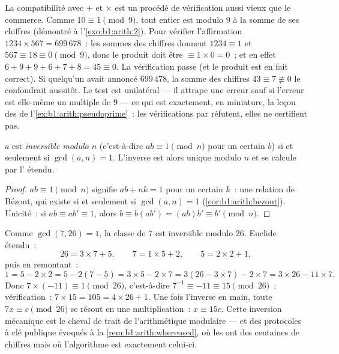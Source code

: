 \begin{example}\label{ex:b1:arith:castingnines}
La compatibilité avec $+$ et $\times$ est un procédé de vérification
aussi vieux que le commerce. Comme $10 \equiv 1 \pmod 9$, tout entier est
 modulo $9$ à la somme de ses chiffres (démontré à
l'\cref{exo:b1:arith:2}). Pour vérifier l'affirmation $1234 \times 567 =
699\,678$~: les sommes des chiffres donnent $1234 \equiv 1$ et $567 \equiv 18
\equiv 0 \pmod 9$, donc le produit doit être $\equiv 1 \times 0 =
0$~; et en effet $6 + 9 + 9 + 6 + 7 + 8 = 45 \equiv 0$. La vérification
passe (et le produit est en fait correct). Si quelqu'un avait annoncé
$699\,478$, la somme des chiffres $43 \equiv 7 \not\equiv 0$ le
confondrait aussitôt. Le test est unilatéral --- il attrape une
erreur sauf si l'erreur est elle-même un multiple de $9$ --- ce qui est
exactement, en miniature, la leçon des  de
l'\cref{ex:b1:arith:pseudoprime}~: les vérifications par 
réfutent, elles ne certifient pas.
\end{example}

\begin{proposition}\label{prop:b1:arith:invmod}
$a$ est \emph{inversible modulo $n$} (c'est-à-dire $ab \equiv 1 \pmod n$ pour un
certain $b$) si et seulement si $\gcd(a, n) = 1$. L'inverse est alors unique modulo
$n$ et se calcule par l' étendu.
\end{proposition}

\begin{proof}
$ab \equiv 1 \pmod n$ signifie $ab + nk = 1$ pour un certain $k$~: une relation
de Bézout, qui existe si et seulement si $\gcd(a,n) = 1$
(\cref{cor:b1:arith:bezout}). Unicité~: si $ab \equiv ab' \equiv 1$,
alors $b \equiv b(ab') = (ab)b' \equiv b' \pmod n$.
\end{proof}

\begin{example}\label{ex:b1:arith:inv7mod26}
Comme $\gcd(7, 26) = 1$, la classe de $7$ est inversible modulo $26$.
Euclide étendu~:
\[
26 = 3 \times 7 + 5, \qquad
7 = 1 \times 5 + 2, \qquad
5 = 2 \times 2 + 1 ,
\]
puis en remontant~:
\[
1 = 5 - 2 \times 2 = 5 - 2(7 - 5) = 3 \times 5 - 2 \times 7
= 3(26 - 3 \times 7) - 2 \times 7 = 3 \times 26 - 11 \times 7 .
\]
Donc $7 \times (-11) \equiv 1 \pmod{26}$, c'est-à-dire $7^{-1} \equiv
-11 \equiv 15 \pmod{26}$~; vérification~: $7 \times 15 = 105 = 4 \times 26
+ 1$. Une fois l'inverse en main, toute  $7x \equiv c
\pmod{26}$ se résout en une multiplication~: $x \equiv 15c$. Cette
inversion mécanique est le cheval de trait de l'arithmétique modulaire ---
et des protocoles à clé publique évoqués à la
\cref{rem:b1:arith:whereused}, où les  ont des centaines de
chiffres mais où l'algorithme est exactement celui-ci.
\end{example}

